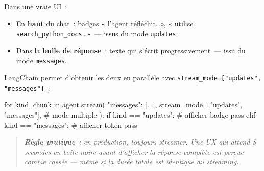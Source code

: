 \documentclass[11pt,a4paper]{article}
\begin{document}
Dans une vraie UI~:
\begin{itemize}[leftmargin=*]
  \item En \textbf{haut} du chat~: badges « l'agent réfléchit\dots »,
        « utilise \texttt{search\_python\_docs}\dots »~— issus du mode
        \texttt{updates}.
  \item Dans la \textbf{bulle de réponse}~: texte qui s'écrit
        progressivement~— issu du mode \texttt{messages}.
\end{itemize}

LangChain permet d'obtenir les deux en parallèle avec
\texttt{stream\_mode=["updates", "messages"]}~:

\begin{pythoncode}
for kind, chunk in agent.stream(
    {"messages": [...]},
    stream_mode=["updates", "messages"],   # mode multiple
):
    if kind == "updates":
        # afficher badge
        pass
    elif kind == "messages":
        # afficher token
        pass
\end{pythoncode}

\begin{quote}\itshape
\textbf{Règle pratique}~: en production, toujours streamer. Une UX qui
attend 8 secondes en boîte noire avant d'afficher la réponse complète
est perçue comme cassée — même si la durée totale est identique au
streaming.
\end{quote}
\end{document}
